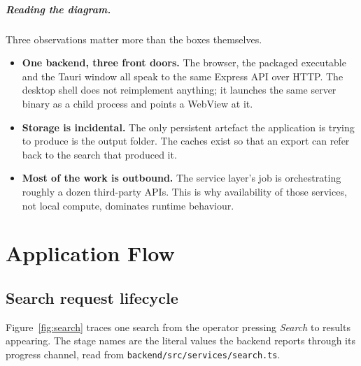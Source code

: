 \documentclass[11pt,a4paper]{report}
\DeclareRobustCommand{\file}[1]{{\small\nolinkurl{#1}}}
\begin{document}
\paragraph{Reading the diagram.} Three observations matter more than the boxes
themselves.

\begin{itemize}
\item \textbf{One backend, three front doors.} The browser, the packaged
executable and the Tauri window all speak to the same Express API over HTTP. The
desktop shell does not reimplement anything; it launches the same server binary
as a child process and points a WebView at it.
\item \textbf{Storage is incidental.} The only persistent artefact the
application is trying to produce is the output folder. The caches exist so that
an export can refer back to the search that produced it.
\item \textbf{Most of the work is outbound.} The service layer's job is
orchestrating roughly a dozen third-party APIs. This is why availability of those
services, not local compute, dominates runtime behaviour.
\end{itemize}

\chapter{Application Flow}
\label{sec:flow}

\section{Search request lifecycle}

Figure~\ref{fig:search} traces one search from the operator pressing
\emph{Search} to results appearing. The stage names are the literal values the
backend reports through its progress channel, read from
\file{backend/src/services/search.ts}.
\end{document}
